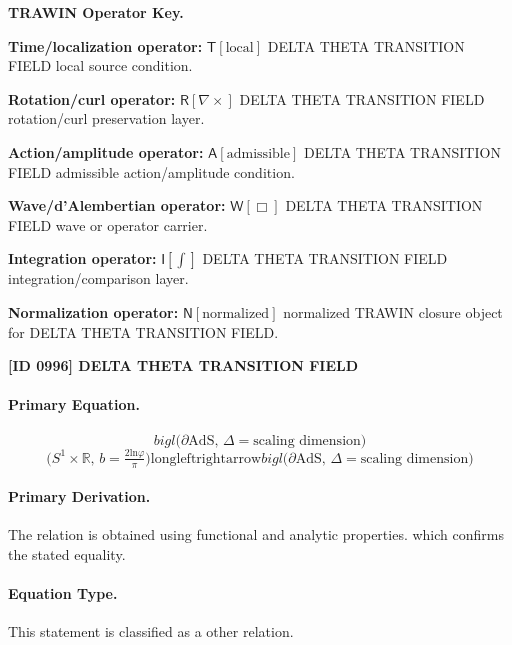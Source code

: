\par\vspace{0.45\baselineskip}
\noindent\begin{minipage}[t]{\linewidth}
\begingroup
\small
\raggedright
\textbf{TRAWIN Operator Key.}\par
\noindent\textbf{Time/localization operator:} $\mathsf{T}\!\left[\mathrm{local}\right]$ DELTA THETA TRANSITION FIELD local source condition.\par
\noindent\textbf{Rotation/curl operator:} $\mathsf{R}\!\left[\nabla\times\right]$ DELTA THETA TRANSITION FIELD rotation/curl preservation layer.\par
\noindent\textbf{Action/amplitude operator:} $\mathsf{A}\!\left[\mathrm{admissible}\right]$ DELTA THETA TRANSITION FIELD admissible action/amplitude condition.\par
\noindent\textbf{Wave/d'Alembertian operator:} $\mathsf{W}\!\left[\Box\right]$ DELTA THETA TRANSITION FIELD wave or operator carrier.\par
\noindent\textbf{Integration operator:} $\mathsf{I}\!\left[\int\right]$ DELTA THETA TRANSITION FIELD integration/comparison layer.\par
\noindent\textbf{Normalization operator:} $\mathsf{N}\!\left[\mathrm{normalized}\right]$ normalized TRAWIN closure object for DELTA THETA TRANSITION FIELD.\par
\endgroup
\end{minipage}

\clearpage
\noindent\textbf{[ID 0996] DELTA THETA TRANSITION FIELD}\par
\vspace{0.35em}
\paragraph{Primary Equation.}
\[
bigl(\partial \mathrm{AdS},\, \Delta = \text{scaling dimension} \bigr)
\]
\[
\bigl(S^{1} \times \mathbb{R},\, b = \tfrac{2\mathrm{ln} \varphi}{\pi} \bigr) \mathrm{longleftrightarrow} bigl(\partial \mathrm{AdS},\, \Delta = \text{scaling dimension} \bigr)
\]

\paragraph{Primary Derivation.}
The relation is obtained using functional and analytic properties. which confirms the stated equality.
\paragraph{Equation Type.}
This statement is classified as a other relation.


